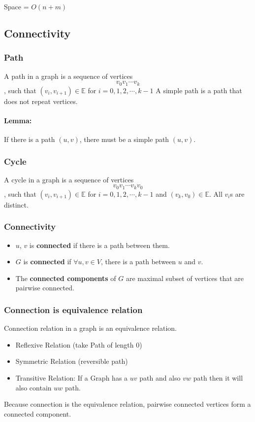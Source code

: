 \documentclass[en,hazy,blue,screen,14pt]{elegantnote}
\begin{document}
Space = $O(n + m)$
\subsection{Connectivity}
\subsubsection{Path}
A path in a graph is a sequence of vertices
\[v_0 v_1 \cdots v_k\]
, such that $(v_i, v_{i+1}) \in \mathbb{E}$ for $i = 0, 1, 2, \cdots, k-1$
A simple path is a path that does not repeat vertices.
\paragraph{Lemma:}
If there is a path $(u, v)$, there must be a simple path $(u, v)$.
\subsubsection{Cycle}
A cycle in a graph is a sequence of vertices
\[v_0 v_1 \cdots v_kv_0\]
, such that $(v_i, v_{i+1}) \in \mathbb{E}$ for $i = 0, 1, 2, \cdots, k-1$ and 
$(v_k, v_{0}) \in \mathbb{E}$. All $v_i$s are distinct.

\subsubsection{Connectivity}
\begin{itemize}
 \item $u$, $v$ is \textbf{connected} if there is a path between them.
 \item $G$ is \textbf{connected} if $\forall u, v \in V$, there is a path 
between $u$ and $v$.
\item The \textbf{connected components} of $G$ are maximal subset of vertices 
that are pairwise connected.
\end{itemize}

\subsubsection{Connection is equivalence relation}
Connection relation in a graph is an equivalence relation.
\begin{itemize}
 \item Reflexive Relation (take Path of length 0)
 \item Symmetric Relation (reversible path)
 \item Transitive Relation: If a Graph has a $uv$ path and also $vw$ path then 
it will also contain $uw$ path.
\end{itemize}
Because connection is the equivalence relation, pairwise connected vertices 
form a connected component.
\end{document}
